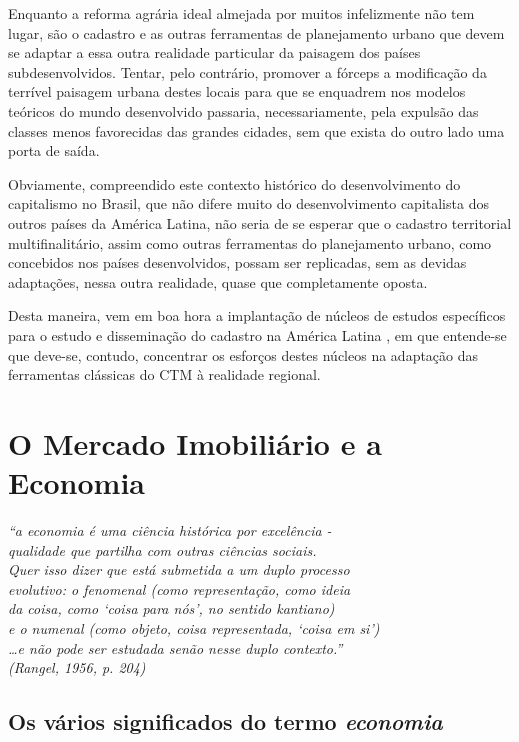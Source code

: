 \documentclass[
	12pt,				%
	oneside,			%
	a4paper,			%
	chapter=TITLE,		%
	section=TITLE,		%
	english,			%
	brazil				%
	]{abntex2}
\begin{document}
Enquanto a reforma agrária ideal almejada por muitos infelizmente não tem lugar,
são o cadastro e as outras ferramentas de planejamento urbano que devem se
adaptar a essa outra realidade particular da paisagem dos países
subdesenvolvidos. Tentar, pelo contrário, promover a fórceps a modificação da
terrível paisagem urbana destes locais para que se enquadrem nos modelos
teóricos do mundo desenvolvido passaria, necessariamente, pela expulsão das
classes menos favorecidas das grandes cidades, sem que exista do outro lado uma
porta de saída.

Obviamente, compreendido este contexto histórico do desenvolvimento do
capitalismo no Brasil, que não difere muito do desenvolvimento capitalista dos
outros países da América Latina, não seria de se esperar que o cadastro
territorial multifinalitário, assim como outras ferramentas do planejamento
urbano, como concebidos nos países desenvolvidos, possam ser replicadas, sem as
devidas adaptações, nessa outra realidade, quase que completamente oposta.

Desta maneira, vem em boa hora a implantação de núcleos de estudos específicos
para o estudo e disseminação do cadastro na América Latina \autocite{lalan}, em que
entende-se que deve-se, contudo, concentrar os esforços destes núcleos na
adaptação das ferramentas clássicas do CTM à realidade regional.

\hypertarget{economia}{%
\chapter{O Mercado Imobiliário e a Economia}\label{economia}}
\begin{epigrafe}
	\vspace*{\fill}
	\begin{flushright}
    \textit{``a economia é uma ciência histórica por excelência -\\
    qualidade que partilha com outras ciências sociais.\\
    Quer isso dizer que está submetida a um duplo processo\\
    evolutivo: o fenomenal (como representação, como ideia \\
    da coisa, como `coisa para nós', no sentido kantiano)\\
    e o numenal (como objeto, coisa representada, `coisa em si')\\
    \ldots e não pode ser estudada senão nesse duplo contexto.''\\
    (Rangel, 1956, p. 204)}
	\end{flushright}
\end{epigrafe}
\hypertarget{os-vuxe1rios-significados-do-termo}{%
\section{\texorpdfstring{Os vários significados do termo \emph{economia}}{Os vários significados do termo }}\label{os-vuxe1rios-significados-do-termo}}
\end{document}
